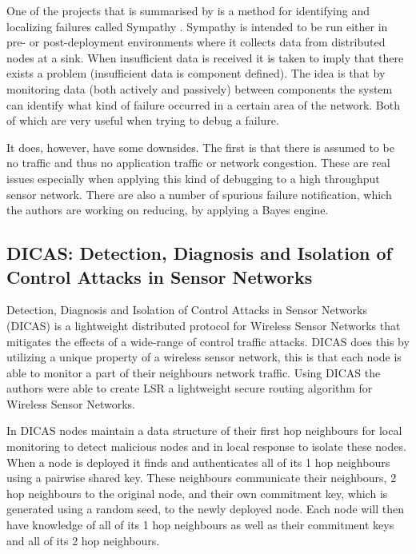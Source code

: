 One of the projects that is summarised by \cite{herbert2007adaptive} is a method for identifying and localizing failures called Sympathy \cite{ramanathan2005sympathy}. Sympathy is intended to be run either in pre- or post-deployment environments where it collects data from distributed nodes at a sink. When insufficient data is received it is taken to imply that there exists a problem (insufficient data is component defined). The idea is that by monitoring data (both actively and passively) between components the system can identify what kind of failure occurred in a certain area of the network. Both of which are very useful when trying to debug a failure.

It does, however, have some downsides. The first is that there is assumed to be no traffic and thus no application traffic or network congestion. These are real issues especially when applying this kind of debugging to a high throughput sensor network. There are also a number of spurious failure notification, which the authors are working on reducing, by applying a Bayes engine.

\subsection {DICAS: Detection, Diagnosis and Isolation of Control Attacks in Sensor Networks\cite{dicaspaper}}

Detection, Diagnosis and Isolation of Control Attacks in Sensor Networks (DICAS) is a lightweight distributed protocol for Wireless Sensor Networks that mitigates the effects of a wide-range of control traffic attacks. DICAS does this by utilizing a unique property of a wireless sensor network, this is that each node is able to monitor a part of their neighbours network traffic. Using DICAS the authors were able to create LSR a lightweight secure routing algorithm for Wireless Sensor Networks.

In DICAS nodes maintain a data structure of their first hop neighbours for local monitoring to detect malicious nodes and in local response to isolate these nodes. When a node is deployed it finds and authenticates all of its 1 hop neighbours using a pairwise shared key. These neighbours communicate their neighbours, 2 hop neighbours to the original node, and their own commitment key, which is generated using a random seed, to the newly deployed node. Each node will then have knowledge of all of its 1 hop neighbours as well as their commitment keys and all of its 2 hop neighbours.

